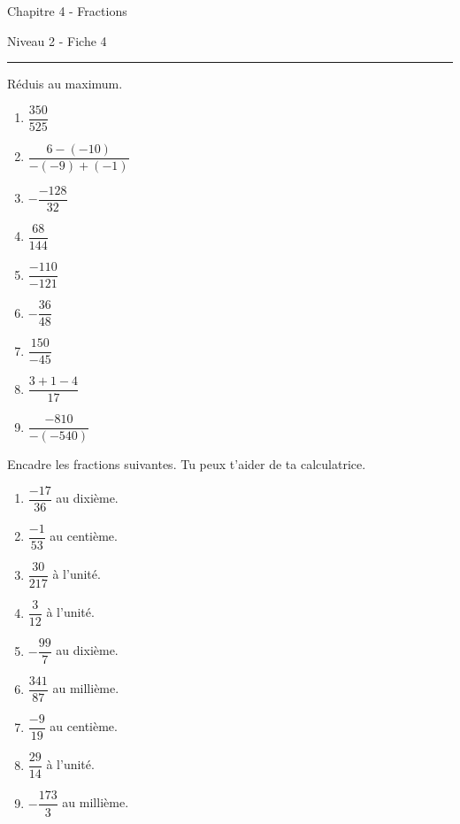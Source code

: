 \documentclass[12pt,parskip=half-, twoside=semi]{scrartcl}
\begin{document}
\newpage
\begin{center}
  \bfseries
  \begin{Huge}
    Chapitre 4 - Fractions
  \end{Huge}
  \smallbreak
  \begin{large}
    Niveau 2  - Fiche 4
  \end{large}
  \smallbreak
  \rule[10pt]{.5\linewidth}{1 pt}
\end{center}

\setcounter{exercise}{0}

\begin{exercise}
  Réduis au maximum.
  \begin{enumerate}[cols=3]
   \item $\dfrac{350}{525}$
   \item $\dfrac{6-(-10)}{-(-9)+(-1)}$
   \item $-\dfrac{- 128}{32}$
   \item $\dfrac{68}{144}$
   \item $\dfrac{- 110}{- 121}$
   \item \(-\dfrac{36}{48}\)
   \item \(\dfrac{150}{-45}\)
   \item \(\dfrac{3 + 1 - 4}{17}\)
   \item \(\dfrac{-810}{-(-540)}\)
  \end{enumerate}
\end{exercise}

\begin{exercise}
  Encadre les fractions suivantes. Tu peux t'aider de ta calculatrice.
  \begin{enumerate}[cols=3]
    \item $\dfrac{-17}{36}$ au dixième.
    \item $\dfrac{-1}{53}$ au centième.
    \item $\dfrac{30}{217}$ à l'unité.
    \item $\dfrac{3}{12}$ à l'unité.
    \item $- \dfrac{99}{7}$ au dixième.
    \item $\dfrac{341}{87}$ au millième.
    \item $\dfrac{- 9}{19}$ au centième.
    \item $\dfrac{29}{14}$ à l'unité.
    \item $-\dfrac{173}{3}$ au millième.
  \end{enumerate}
\end{exercise}
\end{document}

